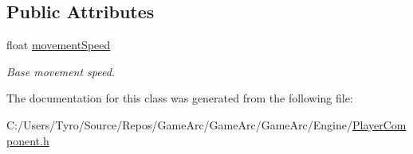 \subsection*{Public Attributes}
\begin{DoxyCompactItemize}
\item 
\mbox{\label{class_player_component_ac3e853e9e00be90dfebbc3d06d445257}} 
float \mbox{\hyperlink{class_player_component_ac3e853e9e00be90dfebbc3d06d445257}{movement\+Speed}}
\begin{DoxyCompactList}\small\item\em Base movement speed. \end{DoxyCompactList}\end{DoxyCompactItemize}


The documentation for this class was generated from the following file\+:\begin{DoxyCompactItemize}
\item 
C\+:/\+Users/\+Tyro/\+Source/\+Repos/\+Game\+Arc/\+Game\+Arc/\+Game\+Arc/\+Engine/\mbox{\hyperlink{_player_component_8h}{Player\+Component.\+h}}\end{DoxyCompactItemize}
